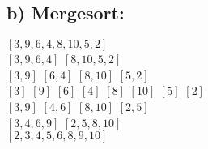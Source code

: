 \documentclass[a4paper,graphics,14pt]{article}
\newcommand{\apt}[1]{\subsection*{#1:} }
\begin{document}
\apt{b) Mergesort}

\begin{center}
\doublespacing
$[3,9,6,4,8,10,5,2]$ \\

$[3,9,6,4]$ \hspace{0,7cm} $[8,10,5,2]$ \\
$[3,9]$ \hspace{0,7cm} $[6,4]$ \hspace{0,7cm} $[8,10]$ \hspace{0,7cm} $[5,2]$ \\
$[3]$ \hspace{0,7cm} $[9]$ \hspace{0,7cm} $[6]$ \hspace{0,7cm} $[4]$ \hspace{0,7cm} $[8]$ \hspace{0,7cm} $[10]$ \hspace{0,7cm} $[5]$ \hspace{0,7cm} $[2]$ \\
$[3,9]$ \hspace{0,7cm} $[4,6]$ \hspace{0,7cm} $[8,10]$ \hspace{0,7cm} $[2,5]$ \\
$[3,4,6,9]$ \hspace{0,7cm} $[2,5,8,10]$ \\
$[2,3,4,5,6,8,9,10]$ \\
\end{center} 
\end{document}
